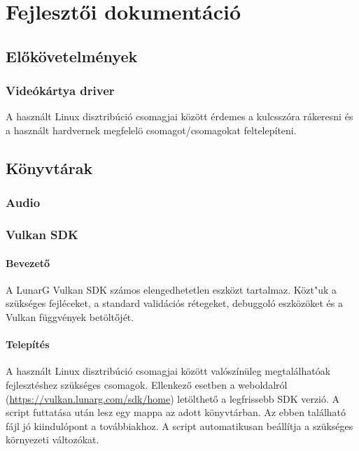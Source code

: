 
\section{Fejleszt\H oi dokument\'aci\'o}




%

\subsection{El\H ok\"ovetelm\'enyek}
\subsubsection{Vide\'ok\'artya driver}
A haszn\'alt Linux disztrib\'uci\'o csomagjai k\"oz\"ott \'erdemes a  kulcssz\'ora r\'akeresni \'es a haszn\'alt hardvernek megfelel\"o csomagot/csomagokat feltelep\'iteni.
\subsection{K\"onyvt\'arak}

\subsubsection{Audio}

\subsubsection{Vulkan SDK}
\paragraph{Bevezet\H o}
A LunarG Vulkan SDK sz\'amos elengedhetetlen eszk\"ozt tartalmaz. K\"ozt"uk a sz\"uks\'eges fejl\'eceket, a standard valid\'aci\'os r\'etegeket, debuggol\'o eszk\"oz\"oket \'es a Vulkan f\"uggv\'enyek bet\"olt\H oj\'et. 
\paragraph{Telep\'it\'es}
A haszn\'alt Linux disztrib\'uci\'o csomagjai k\"oz\"ott val\'osz\'in\"uleg megtal\'alhat\'oak fejleszt\'eshez sz\"uks\'eges csomagok. 
\newline
Ellenkez\H o esetben a weboldalr\'ol (\url{https://vulkan.lunarg.com/sdk/home}) let\"olthet\H o a legfrissebb SDK verzi\'o.
A script futtat\'asa ut\'an lesz egy  mappa az adott k\"onyvt\'arban.
Az ebben tal\'alhat\'o  f\'ajl j\'o kiindul\'opont a tov\'abbiakhoz.
A  script automatikusan be\'all\'itja a sz\"uks\'eges k\"ornyezeti v\'altoz\'okat.
